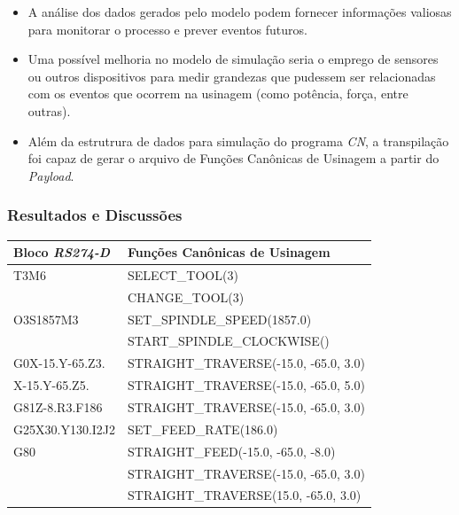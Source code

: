 \documentclass[aspectratio=169]{beamer}
\begin{document}
{\begin{frame}[fragile]
  \begin{itemize}
    \item A análise dos dados gerados pelo modelo podem fornecer 
          informações valiosas para monitorar o processo e prever 
          eventos futuros.
    \item Uma possível melhoria no modelo de simulação seria o 
          emprego de sensores ou outros dispositivos para medir grandezas
          que pudessem ser relacionadas com os eventos que ocorrem na 
          usinagem (como potência, força, entre outras).
    \item Além da estrutrura de dados para simulação do programa 
          \emph{CN}, a transpilação foi capaz de gerar o arquivo de 
          Funções Canônicas de Usinagem a partir do \emph{Payload}.
  \end{itemize}

\end{frame}


\begin{frame}[fragile]
  \frametitle{Resultados e Discussões}

  \begin{tabular}{ |l|l| }

    \hline
    \scriptsize{\bfseries{Bloco \emph{RS274-D}}} & 
    \scriptsize{\bfseries{Funções Canônicas de Usinagem}} \\
    \hline

    \scriptsize{T3M6} & \scriptsize{SELECT\_TOOL(3)} \\
    & \scriptsize{CHANGE\_TOOL(3)} \\ 
    \hline
    \scriptsize{O3S1857M3} & \scriptsize{SET\_SPINDLE\_SPEED(1857.0)} \\
    & \scriptsize{START\_SPINDLE\_CLOCKWISE()} \\
    \hline
    \scriptsize{G0X-15.Y-65.Z3.} & \scriptsize{STRAIGHT\_TRAVERSE(-15.0, -65.0, 3.0)} \\
    \hline
    \scriptsize{X-15.Y-65.Z5.} & \scriptsize{STRAIGHT\_TRAVERSE(-15.0, -65.0, 5.0)} \\
    \hline
    \scriptsize{G81Z-8.R3.F186} & \scriptsize{STRAIGHT\_TRAVERSE(-15.0, -65.0, 3.0)} \\
    \scriptsize{G25X30.Y130.I2J2} & \scriptsize{SET\_FEED\_RATE(186.0)} \\
    \scriptsize{G80} & \scriptsize{STRAIGHT\_FEED(-15.0, -65.0, -8.0)} \\
    & \scriptsize{STRAIGHT\_TRAVERSE(-15.0, -65.0, 3.0)} \\
    & \scriptsize{STRAIGHT\_TRAVERSE(15.0, -65.0, 3.0)} \\
    \hline


\end{tabular}
\end{frame}}
\end{document}
